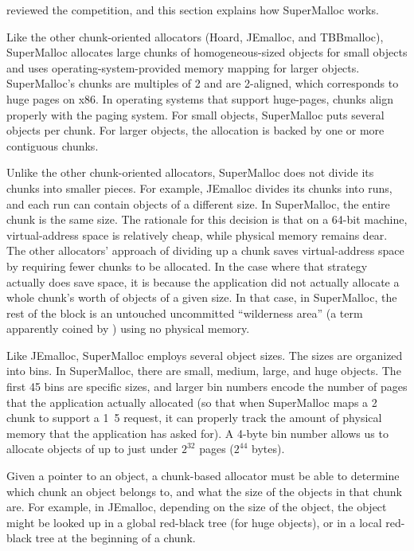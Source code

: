 \documentclass[natbib,sort&compress,10pt]{sigplanconf}
\begin{document}

 reviewed the competition, and this section explains how
SuperMalloc works.   

Like the other chunk-oriented allocators (Hoard, JEmalloc, and
TBBmalloc), SuperMalloc allocates large chunks of homogeneous-sized
objects for small objects and uses operating-system-provided memory
mapping for larger objects.  SuperMalloc's chunks are multiples of
\unit{2}\mebi\byte{} and are \unit{2}\mebi\byte{}-aligned, which
corresponds to huge pages on x86.  In operating systems that support
huge-pages, chunks align properly with the paging system.  For small
objects, SuperMalloc puts several objects per chunk.  For larger
objects, the allocation is backed by one or more contiguous chunks.

Unlike the other chunk-oriented allocators, SuperMalloc does not
divide its chunks into smaller pieces.  For example, JEmalloc divides
its chunks into runs, and each run can contain objects of a different
size.  In SuperMalloc, the entire chunk is the same size.  The
rationale for this decision is that on a 64-bit machine,
virtual-address space is relatively cheap, while physical memory
remains dear.  The other allocators' approach of dividing up a chunk
saves virtual-address space by requiring fewer chunks to be allocated.
In the case where that strategy actually does save space, it is
because the application did not actually allocate a whole chunk's
worth of objects of a given size.  In that case, in SuperMalloc, the
rest of the block is an untouched uncommitted ``wilderness area'' (a
term apparently coined by \cite{KornVo85}) using no physical memory.



Like JEmalloc, SuperMalloc employs several object sizes.  The sizes
are organized into bins.  In SuperMalloc, there are small, medium,
large, and huge objects.  The first 45 bins are specific sizes, and
larger bin numbers encode the number of pages that the application
actually allocated (so that when SuperMalloc maps a
\unit{2}\mebi\byte{} chunk to support a \unit{1.5}\mebi\byte{}
request, it can properly track the amount of physical memory that the
application has asked for).  A 4-byte bin number allows us to allocate
objects of up to just under $2^{32}$ pages ($2^{44}$ bytes).

Given a pointer to an object, a chunk-based allocator must be able to
determine which chunk an object belongs to, and what the size of the
objects in that chunk are.  For example, in JEmalloc, depending on the
size of the object, the object might be looked up in a global
red-black tree (for huge objects), or in a local red-black tree at the
beginning of a chunk.
\end{document}
